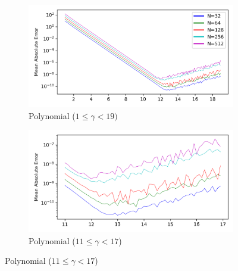 \documentclass[a4paper]{report}
\begin{document}
\begin{figure}[H]
    \begin{subfigure}{.45\linewidth}
      \includegraphics[width=\linewidth]{images/cavers/polynomial_2N.png}
      \caption{Polynomial ($1 \leq \gamma < 19)$}
    \end{subfigure}\hfill
    \begin{subfigure}{.45\linewidth}
      \includegraphics[width=\linewidth]{images/cavers/polynomial_zoomed_2N.png}
      \caption{Polynomial ($11 \leq \gamma < 17$)}
    \end{subfigure}
    
    \medskip
    

\end{figure}
\end{document}
